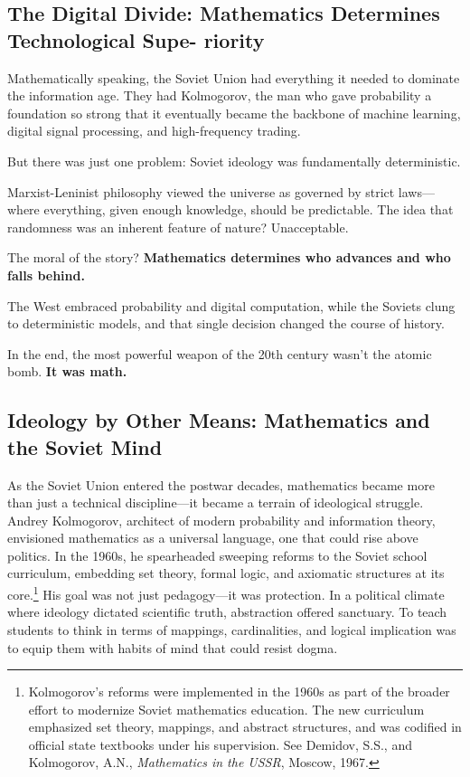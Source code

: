 \subsection{The Digital Divide: Mathematics Determines Technological Supe- riority}

Mathematically speaking, the Soviet Union had everything it needed to dominate the information age. They had Kolmogorov, the man who gave probability a foundation so strong that it eventually became the backbone of machine learning, digital signal processing, and high-frequency trading.

But there was just one problem: Soviet ideology was fundamentally deterministic.  

Marxist-Leninist philosophy viewed the universe as governed by strict laws—where everything, given enough knowledge, should be predictable. The idea that randomness was an inherent feature of nature? Unacceptable.

The moral of the story? \textbf{Mathematics determines who advances and who falls behind.}  

The West embraced probability and digital computation, while the Soviets clung to deterministic models, and that single decision changed the course of history.  

In the end, the most powerful weapon of the 20th century wasn’t the atomic bomb.  \textbf{It was math.}

\subsection{Ideology by Other Means: Mathematics and the Soviet Mind}

As the Soviet Union entered the postwar decades, mathematics became more than just a technical discipline—it became a terrain of ideological struggle. Andrey Kolmogorov, architect of modern probability and information theory, envisioned mathematics as a universal language, one that could rise above politics. In the 1960s, he spearheaded sweeping reforms to the Soviet school curriculum, embedding set theory, formal logic, and axiomatic structures at its core.\footnote{Kolmogorov’s reforms were implemented in the 1960s as part of the broader effort to modernize Soviet mathematics education. The new curriculum emphasized set theory, mappings, and abstract structures, and was codified in official state textbooks under his supervision. See Demidov, S.S., and Kolmogorov, A.N., \textit{Mathematics in the USSR}, Moscow, 1967.} His goal was not just pedagogy—it was protection. In a political climate where ideology dictated scientific truth, abstraction offered sanctuary. To teach students to think in terms of mappings, cardinalities, and logical implication was to equip them with habits of mind that could resist dogma.

